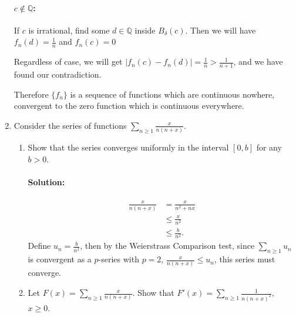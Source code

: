 \documentclass{article}
\begin{document}
\begin{enumerate}
\paragraph{$c\not\in \mathbb{Q}$:} If $c$ is irrational, find some $d\in\mathbb{Q}$ inside $B_{\delta}(c)$. Then we will have $f_n(d)=\frac{1}{n}$ and $f_n(c)=0$

Regardless of case, we will get $|f_n(c)-f_n(d)|=\frac{1}{n}>\frac{1}{n+1}$, and we have found our contradiction.

  Therefore $\{f_n\} $ is a sequence of functions which are continuous nowhere, convergent to the zero function which is continuous everywhere. 

\item Consider the series of functions $\sum_{n\geq 1}^{} \frac{x}{n(n+x)}$.
  \begin{enumerate}
    \item Show that the series converges uniformly in the interval $[0,b]$ for any $b>0$.

        \paragraph{Solution:} 
        \begin{align*}
            \frac{x}{n(n+x)}&= \frac{x}{n^2+nx} \\
                            &\leq \frac{x}{n^2}\\
                            &\leq \frac{b}{n^2}
        .\end{align*}
        Define $u_n=\frac{b}{n^2}$, then by the Weierstrass Comparison test, since $\sum_{n\geq 1}^{} u_n$ is convergent as a $p$-series with $p=2$, $\frac{x}{n(n+x)}\leq u_n$, this series must converge.

    \item Let $F(x)=\sum_{n\geq 1}^{} \frac{x}{n(n+x)}$. Show that $F'(x)=\sum_{n\geq 1}^{} \frac{1}{n(n+x)^2}$, $x\geq 0$.

\end{enumerate}
\end{enumerate}
\end{document}
